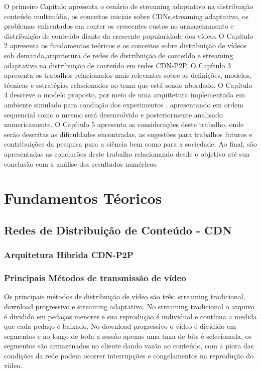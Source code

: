 \documentclass[
	12pt,
	oneside,
	a4paper,
	english,
	brazil
	]{abntex2ppgsi}
\begin{document}
O primeiro Capítulo apresenta o cenário de streaming adaptativo na distribuição conteúdo multimídia, os conceitos iniciais sobre CDNs,streaming adaptativo, os problemas enfrentados em conter os crescentes custos no armazenamento e distribuição de conteúdo diante da crescente popularidade dos vídeos
O Capítulo 2 apresenta os fundamentos teóricos e os conceitos sobre distribuição de vídeos sob demanda,arquitetura de redes de distribuição de conteúdo e streaming adaptativo na distribuição de conteúdo em redes CDN-P2P.
O Capítulo 3 apresenta os trabalhos relacionados mais relevantes sobre as definições, modelos, técnicas e estratégias relacionados ao tema que está sendo abordado. 
O Capítulo 4 descreve o modelo proposto, por meio de uma arquitetura implementada em ambiente simulado para condução dos experimentos , apresentando em ordem sequencial como o mesmo será desenvolvido e posteriormente analisado numericamente.
O Capítulo 5 apresenta as considerações deste trabalho, onde serão descritas as dificuldades encontradas, as sugestões para trabalhos futuros e contribuições da pesquisa para a ciência bem como para a sociedade. Ao final, são apresentadas as conclusões deste trabalho relacionando desde o objetivo até sua conclusão com a análise dos resultados numéricos.



\chapter{Fundamentos Téoricos}

\section{Redes de Distribuição de Conteúdo - CDN}

 

\subsection{Arquitetura Híbrida CDN-P2P}






\subsection{Principais Métodos de transmissão de vídeo}

Os principais métodos de distribuição de vídeo são três: streaming tradicional, download progressivo e streaming adaptativo. No streaming tradicional o arquivo  é dividido em pedaços menores e sua reprodução é individual e contínua a medida que cada pedaço é baixado. No download progressivo o vídeo é dividido em segmentos e ao longo de toda a  sessão  apenas uma taxa de bits é selecionada, os segmentos são armazenados no cliente dando vazão ao conteúdo, com a piora das condições da rede podem ocorrer interrupções e congelamentos na reprodução do vídeo.
\end{document}
